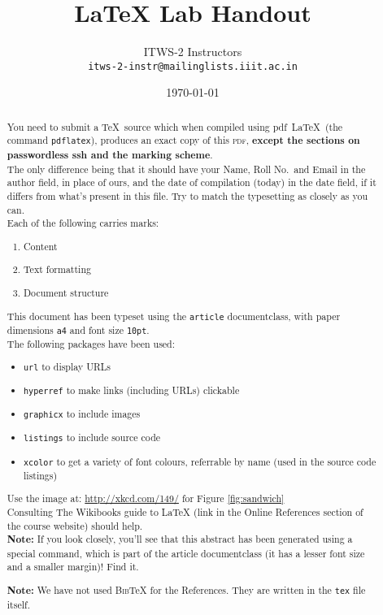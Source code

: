 \documentclass[a4paper,10pt,titlepage]{article}
\title{\LaTeX{} Lab Handout}
\author{ITWS-2 Instructors \\ \texttt{itws-2-instr@mailinglists.iiit.ac.in}}
\date{\today}
\begin{document}
\maketitle

\tableofcontents

\newpage

\begin{abstract}
  You need to submit a \TeX\ source which when compiled using
  pdf~\LaTeX\ (the command \texttt{pdflatex}), produces an exact copy
  of this \textsc{pdf}, \textbf{except the sections on passwordless ssh and the marking scheme}.\\

  The only difference being that it should have your Name, Roll
  No.~and Email in the author field, in place of ours, and the date
  of compilation (today) in the date field, if it differs from what's
  present in this file. Try to match
  the typesetting as closely as you can.\\

  \noindent Each of the following carries marks:
  \begin{enumerate}
  \item Content
  \item Text formatting
  \item Document structure
  \end{enumerate}

  \noindent This document has been typeset using the \texttt{article}
  documentclass, with paper dimensions \texttt{a4} and font size \texttt{10pt}.\\

  \noindent The following packages have been used:
  \begin{itemize}
  \item \texttt{url} to display URLs
  \item \texttt{hyperref} to make links (including URLs) clickable
  \item \texttt{graphicx} to include images
  \item \texttt{listings} to include source code
  \item \texttt{xcolor} to get a variety of font colours, referrable
    by name (used in the source code listings)
  \end{itemize}

  \noindent Use the image at: \url{http://xkcd.com/149/} for Figure \ref{fig:sandwich}\\

  \noindent Consulting The Wikibooks guide to \LaTeX{} (link
  in the Online References section of the course website) should help.\\

  \textbf{Note: } If you look closely, you'll see that this abstract
  has been generated using a special command, which is part of the
  article documentclass (it has a lesser font size and a smaller
  margin)! Find it.

  \textbf{Note: } We have not used \textsc{Bib}\TeX{} for the References. They
  are written in the \texttt{tex} file itself.
\end{abstract}
\end{document}
